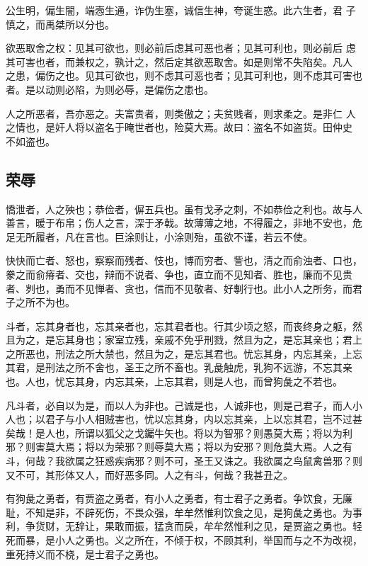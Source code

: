 \documentclass[]{article}
\begin{document}
公生明，偏生闇，端悫生通，诈伪生塞，诚信生神，夸诞生惑。此六生者，君
子慎之，而禹桀所以分也。

欲恶取舍之权：见其可欲也，则必前后虑其可恶也者；见其可利也，则必前后
虑其可害也者，而兼权之，孰计之，然后定其欲恶取舍。如是则常不失陷矣。凡人
之患，偏伤之也。见其可欲也，则不虑其可恶也者；见其可利也，则不虑其可害也
者。是以动则必陷，为则必辱，是偏伤之患也。

人之所恶者，吾亦恶之。夫富贵者，则类傲之；夫贫贱者，则求柔之。是非仁
人之情也，是奸人将以盗名于晻世者也，险莫大焉。故曰：盗名不如盗货。田仲史
不如盗也。

\hypertarget{header-n24}{%
\subsection{荣辱}\label{header-n24}}

憍泄者，人之殃也；恭俭者，偋五兵也。虽有戈矛之刺，不如恭俭之利也。故与人善言，暖于布帛；伤人之言，深于矛戟。故薄薄之地，不得履之，非地不安也，危足无所履者，凡在言也。巨涂则让，小涂则殆，虽欲不谨，若云不使。

快快而亡者、怒也，察察而残者、忮也，博而穷者、訾也，清之而俞浊者、口也，豢之而俞瘠者、交也，辩而不说者、争也，直立而不见知者、胜也，廉而不见贵者、刿也，勇而不见惮者、贪也，信而不见敬者、好剸行也。此小人之所务，而君子之所不为也。

斗者，忘其身者也，忘其亲者也，忘其君者也。行其少顷之怒，而丧终身之躯，然且为之，是忘其身也；家室立残，亲戚不免乎刑戮，然且为之，是忘其亲也；君上之所恶也，刑法之所大禁也，然且为之，是忘其君也。忧忘其身，内忘其亲，上忘其君，是刑法之所不舍也，圣王之所不畜也。乳彘触虎，乳狗不远游，不忘其亲也。人也，忧忘其身，内忘其亲，上忘其君，则是人也，而曾狗彘之不若也。

凡斗者，必自以为是，而以人为非也。己诚是也，人诚非也，则是己君子，而人小人也；以君子与小人相贼害也，忧以忘其身，内以忘其亲，上以忘其君，岂不过甚矣哉！是人也，所谓以狐父之戈钃牛矢也。将以为智邪？则愚莫大焉；将以为利邪？则害莫大焉；将以为荣邪？则辱莫大焉；将以为安邪？则危莫大焉。人之有斗，何哉？我欲属之狂惑疾病邪？则不可，圣王又诛之。我欲属之鸟鼠禽兽邪？则又不可，其形体又人，而好恶多同。人之有斗，何哉？我甚丑之。

有狗彘之勇者，有贾盗之勇者，有小人之勇者，有士君子之勇者。争饮食，无廉耻，不知是非，不辟死伤，不畏众强，牟牟然惟利饮食之见，是狗彘之勇也。为事利，争货财，无辞让，果敢而振，猛贪而戾，牟牟然惟利之见，是贾盗之勇也。轻死而暴，是小人之勇也。义之所在，不倾于权，不顾其利，举国而与之不为改视，重死持义而不桡，是士君子之勇也。
\end{document}
